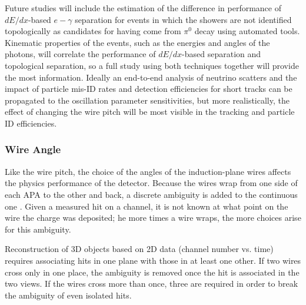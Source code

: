 Future studies will include the estimation of the difference in
performance of $dE/dx$-based $e-\gamma$ separation for events in which
the showers are not identified topologically as candidates for having
come from $\pi^0$ decay using automated tools.  
%
Kinematic properties
of the events, such as the energies and angles of the photons, will 
correlate the performance of $dE/dx$-based separation and topological
separation, so a full study using both techniques together will
provide the most information.  Ideally an end-to-end analysis of
neutrino scatters and the impact of particle mis-ID rates and
detection efficiencies for short tracks can be propagated to the
oscillation parameter sensitivities, but more realistically, the
effect of changing the wire pitch will be most visible in the tracking
and particle ID efficiencies.


\subsubsection{Wire Angle}

Like the wire pitch, the choice of the angles of the induction-plane
wires  affects the physics performance of the detector.  Because the
wires wrap from one side of each APA to the other and back, a discrete
ambiguity is added to the continuous one .
Given a measured hit on a channel, it is not known at what point on the wire the charge was
deposited; he more times a wire wraps, the more choices arise for this
ambiguity.

Reconstruction of 3D objects based on 2D
 data (channel number vs. time) requires associating hits in one plane
with those in at least one other. %
If two wires cross only
in one place, %
the ambiguity is removed once the hit is associated in the
two views.  If the wires cross more than once, three  are required in order to
break the ambiguity of even isolated hits.

